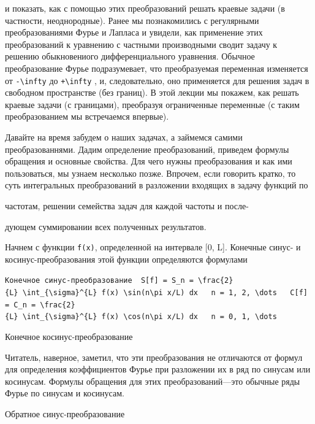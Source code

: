\documentclass[
  ukrainian,
]{article}
\begin{document}
и показать, как с помощью этих преобразований решать краевые задачи (в
частности, неоднородные). Ранее мы познакомились с регулярными
преобразованиями Фурье и Лапласа и увидели, как применение этих
преобразований к уравнению с частными производными сводит задачу к
решению обыкновениого дифференциального уравнения. Обычное
преобразование Фурье подразумевает, что преобразуемая переменная
изменяется от \texttt{-\textbackslash{}infty} до
\texttt{+\textbackslash{}infty} , и, следовательно, оно применяется для
решения задач в свободном пространстве (без границ). В этой лекции мы
покажем, как решать краевые задачи (с границами), преобразуя
ограниченные переменные (с таким преобразованием мы встречаемся
впервые).

Давайте на время забудем о наших задачах, а займемся самими
преобразованнями. Дадим определение преобразований, приведем формулы
обращения и основные свойства. Для чего нужны преобразования и как ими
пользоваться, мы узнаем несколько позже. Впрочем, если говорить кратко,
то суть интегральных преобразований в разложении входящих в задачу
функций по

частотам, решении семейства задач для каждой частоты и после-

дующем суммировании всех полученных результатов.

Начнем с функции \texttt{f(x)}, определенной на интервале {[}0, L{]}.
Конечные синус- и косинус-преобразования этой функции определяются
формулами

\texttt{Конечное\ синус-преобразование\ \ \textquotesingle{}S{[}f{]}\ =\ S\_n\ =\ \textbackslash{}frac\{2\}\{L\}\ \textbackslash{}int\_\{\textbackslash{}sigma\}\^{}\{L\}\ f(x)\ \textbackslash{}sin(n\textbackslash{}pi\ x/L)\ dx\textquotesingle{}\ \ \ \textquotesingle{}n\ =\ 1,\ 2,\ \textbackslash{}dots\textquotesingle{}\ \ \ \textquotesingle{}C{[}f{]}\ =\ C\_n\ =\ \textbackslash{}frac\{2\}\{L\}\ \textbackslash{}int\_\{\textbackslash{}sigma\}\^{}\{L\}\ f(x)\ \textbackslash{}cos(n\textbackslash{}pi\ x/L)\ dx\textquotesingle{}\ \ \ \textquotesingle{}n\ =\ 0,\ 1,\ \textbackslash{}dots\textquotesingle{}}

Конечное косинус-преобразование

Читатель, наверное, заметил, что эти преобразования не отличаются от
формул для определения коэффициентов Фурье при разложении их в ряд по
синусам или косинусам. Формулы обращения для этих преобразований---это
обычные ряды Фурье по синусам и косинусам.

Обратное синус-преобразование
\end{document}
